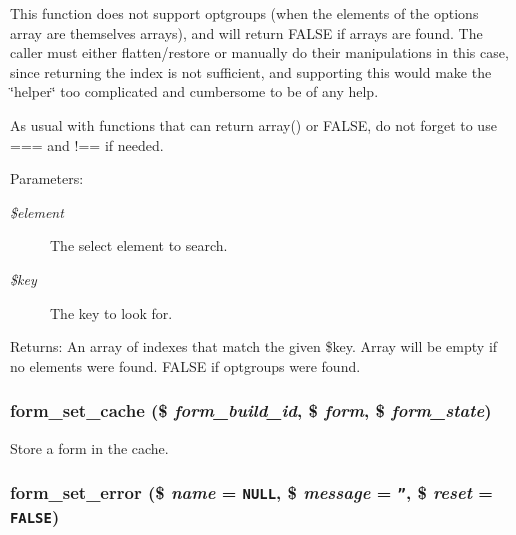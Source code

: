 This function does not support optgroups (when the elements of the options array are themselves arrays), and will return FALSE if arrays are found. The caller must either flatten/restore or manually do their manipulations in this case, since returning the index is not sufficient, and supporting this would make the \char`\"{}helper\char`\"{} too complicated and cumbersome to be of any help.

As usual with functions that can return array() or FALSE, do not forget to use === and !== if needed.

\begin{Desc}
\item[Parameters:]
\begin{description}
\item[{\em \$element}]The select element to search. \item[{\em \$key}]The key to look for. \end{description}
\end{Desc}
\begin{Desc}
\item[Returns:]An array of indexes that match the given \$key. Array will be empty if no elements were found. FALSE if optgroups were found. \end{Desc}
\hypertarget{group__form__api_g274fe9a7fe000a43b7f173e3b54dae7f}{
\subsubsection[{form\_\-set\_\-cache}]{\setlength{\rightskip}{0pt plus 5cm}form\_\-set\_\-cache (\$ {\em form\_\-build\_\-id}, \/  \$ {\em form}, \/  \$ {\em form\_\-state})}}
\label{group__form__api_g274fe9a7fe000a43b7f173e3b54dae7f}


Store a form in the cache. \hypertarget{group__form__api_g08508e9a72925348973bb1a051a3ab99}{
\subsubsection[{form\_\-set\_\-error}]{\setlength{\rightskip}{0pt plus 5cm}form\_\-set\_\-error (\$ {\em name} = {\tt NULL}, \/  \$ {\em message} = {\tt ''}, \/  \$ {\em reset} = {\tt FALSE})}}
\label{group__form__api_g08508e9a72925348973bb1a051a3ab99}


